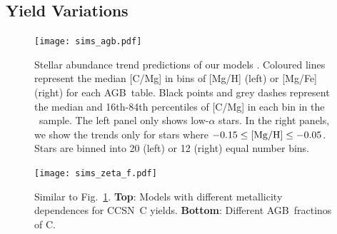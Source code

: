 \documentclass[fleqn,
usenatbib]{mnras}
\newcommand{\citetjack}{\citet{jack}}
\newcommand{\agb}{AGB}
\newcommand{\cc}{CCSN}
\newcommand{\ia}{SN Ia}
\newcommand{\caah}{[C/Mg]-[Mg/H]}
\newcommand{\caafe}{[C/Mg]-[Mg/Fe]}
\begin{document}
% 

\subsection{Yield Variations}\label{sec:results_highmass}
\label{sec:agb_results}




\begin{figure}
\texttt{[image: sims\_agb.pdf]}

\caption[]{
    Stellar abundance trend predictions of our models . Coloured lines represent the median [C/Mg] in bins of [Mg/H] (left) or [Mg/Fe] (right) for each \agb\ table. Black points and grey dashes represent the median and 16th-84th percentiles of [C/Mg] in each bin in the \citetjack~sample. 
    The left panel only shows low-$\alpha$ stars. In the right panels, we show the trends only for stars where $-0.15\leq {\rm [Mg/H]}\leq -0.05$.
    Stars are binned into 20 (left) or 12 (right) equal number bins. 
}
\label{fig:first_models}
\end{figure}


\begin{figure}
\texttt{[image: sims\_zeta\_f.pdf]}

\caption[]{
    Similar to Fig.~\ref{fig:first_models}. 
    \textbf{Top}: Models with different metallicity dependences for  \cc\ C yields. \textbf{Bottom}: Different \agb\ fractinos of C.
}
\label{fig:zeta_f}
\end{figure}
\end{document}
